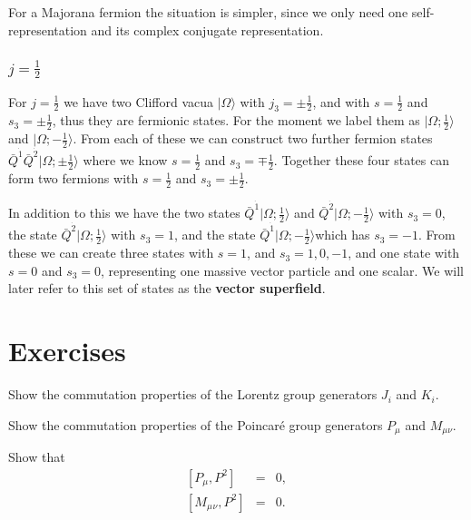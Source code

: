 \documentclass[notes.tex]{subfiles}
\begin{document}
For a Majorana fermion the situation is simpler, since we only need one self-representation and its complex conjugate representation. 

\subsubsection{$j=\frac{1}{2}$}
For $j=\frac{1}{2}$ we have two Clifford vacua $|\Omega\rangle $ with $j_3=\pm\frac{1}{2}$, and with $s=\frac{1}{2}$ and $s_3 = \pm\frac{1}{2}$, thus they are fermionic states. For the moment we label them as  $|\Omega; \frac{1}{2}\rangle$ and $|\Omega; -\frac{1}{2}\rangle$. From each of these we can construct two further fermion states $\bar{Q}^{\dot{1}}\bar{Q}^{\dot{2}}|\Omega;\pm \frac{1}{2}\rangle$ where we know $s=\frac{1}{2}$ and $s_3 = \mp\frac{1}{2}$.  Together these four states can form two fermions with $s = \frac{1}{2}$ and $s_3=\pm\frac{1}{2}$.

In addition to this we have the two states $\bar{Q}^{\dot{1}}|\Omega;\frac{1}{2}\rangle$ and $\bar{Q}^{\dot{2}}|\Omega; -\frac{1}{2}\rangle$ with $s_3 = 0$, the state $\bar{Q}^{\dot{2}}|\Omega;\frac{1}{2}\rangle$ with $s_3 = 1$, and the state $\bar{Q}^{\dot{1}}|\Omega;-\frac{1}{2}\rangle$which has $s_3 = -1$. From these we can create three states with $s=1$, and $s_3 = 1, 0, -1$, and one state with $s=0$ and $s_3=0$, representing one massive vector particle and one scalar. We will later refer to this set of states as the {\bf vector superfield}.




\section{Exercises}

\begin{Exercise}[]
Show the commutation properties of the Lorentz group generators $J_i$ and $K_i$.
\end{Exercise}

\begin{Exercise}[]
Show the commutation properties of the Poincaré group generators $P_\mu$ and $M_{\mu\nu}$.
\end{Exercise}

\begin{Exercise}[]
Show that
\begin{eqnarray}
\left[P_\mu, P^2\right] &=& 0,\\
\left[M_\mu{}_{\nu}, P^2\right]& =& 0.
\end{eqnarray}
\end{Exercise}
\end{document}
